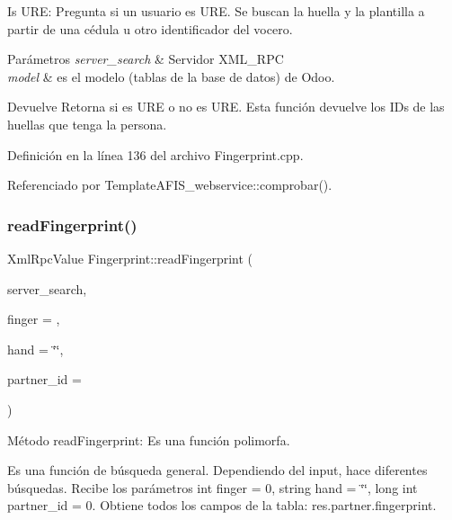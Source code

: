 Is U\+RE\+: Pregunta si un usuario es U\+RE. Se buscan la huella y la plantilla a partir de una cédula u otro identificador del vocero. 


\begin{DoxyParams}{Parámetros}
{\em server\+\_\+search} & Servidor X\+M\+L\+\_\+\+R\+PC \\
\hline
{\em model} & es el modelo (tablas de la base de datos) de Odoo. \\
\hline
\end{DoxyParams}
\begin{DoxyReturn}{Devuelve}
Retorna si es U\+RE o no es U\+RE. Esta función devuelve los I\+Ds de las huellas que tenga la persona. 
\end{DoxyReturn}


Definición en la línea 136 del archivo Fingerprint.\+cpp.



Referenciado por Template\+A\+F\+I\+S\+\_\+webservice\+::comprobar().

\hypertarget{classFingerprint_af2bb2ab8e1a31d1b7e41d39b728d1bb5}{}\label{classFingerprint_af2bb2ab8e1a31d1b7e41d39b728d1bb5} 
\subsubsection{\texorpdfstring{read\+Fingerprint()}{readFingerprint()}\hspace{0.1cm}{\footnotesize\ttfamily [1/2]}}
{\footnotesize\ttfamily Xml\+Rpc\+Value Fingerprint\+::read\+Fingerprint (\begin{DoxyParamCaption}\item[{Xml\+Rpc\+Client}]{server\+\_\+search,  }\item[{int}]{finger = {},  }\item[{string}]{hand = {\ttfamily \char`\"{}\char`\"{}},  }\item[{long int}]{partner\+\_\+id = {} }\end{DoxyParamCaption})\hspace{0.3cm}{\ttfamily [inline]}}



Método read\+Fingerprint\+: Es una función polimorfa. 

Es una función de búsqueda general. Dependiendo del input, hace diferentes búsquedas. Recibe los parámetros int finger = 0, string hand = \char`\"{}\char`\"{}, long int partner\+\_\+id = 0. Obtiene todos los campos de la tabla\+: res.\+partner.\+fingerprint.

